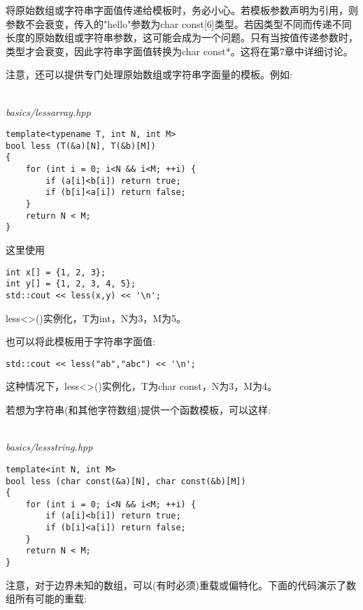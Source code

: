 将原始数组或字符串字面值传递给模板时，务必小心。若模板参数声明为引用，则参数不会衰变，传入的"hello"参数为char const[6]类型。若因类型不同而传递不同长度的原始数组或字符串参数，这可能会成为一个问题。只有当按值传递参数时，类型才会衰变，因此字符串字面值转换为char const*。这将在第7章中详细讨论。

注意，还可以提供专门处理原始数组或字符串字面量的模板。例如:

\hspace*{\fill} \\ %
\noindent
\textit{basics/lessarray.hpp}
\begin{lstlisting}[style=styleCXX]
template<typename T, int N, int M>
bool less (T(&a)[N], T(&b)[M])
{
	for (int i = 0; i<N && i<M; ++i) {
		if (a[i]<b[i]) return true;
		if (b[i]<a[i]) return false;
	}
	return N < M;
}
\end{lstlisting}

这里使用

\begin{lstlisting}[style=styleCXX]
int x[] = {1, 2, 3};
int y[] = {1, 2, 3, 4, 5};
std::cout << less(x,y) << '\n';
\end{lstlisting}

less<>()实例化，T为int，N为3，M为5。

也可以将此模板用于字符串字面值:

\begin{lstlisting}[style=styleCXX]
std::cout << less("ab","abc") << '\n';
\end{lstlisting}

这种情况下，less<>()实例化，T为char const，N为3，M为4。

若想为字符串(和其他字符数组)提供一个函数模板，可以这样:

\hspace*{\fill} \\ %
\noindent
\textit{basics/lessstring.hpp}
\begin{lstlisting}[style=styleCXX]
template<int N, int M>
bool less (char const(&a)[N], char const(&b)[M])
{
	for (int i = 0; i<N && i<M; ++i) {
		if (a[i]<b[i]) return true;
		if (b[i]<a[i]) return false;
	}
	return N < M;
}
\end{lstlisting}

注意，对于边界未知的数组，可以(有时必须)重载或偏特化。下面的代码演示了数组所有可能的重载:

